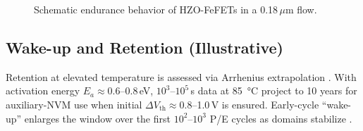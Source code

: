 \documentclass[journal]{IEEEtran}
\begin{document}
\begin{figure}[t]
\centering
{}
\caption{Schematic endurance behavior of HZO-FeFETs in a 0.18\,$\mu$m flow.}
\label{fig:endurance}
\end{figure}

\subsection*{Wake-up and Retention (Illustrative)}
Retention at elevated temperature is assessed via Arrhenius extrapolation \cite{Yamazaki2018}. With activation energy $E_a\!\approx\!0.6$--0.8\,eV, $10^3$--$10^5$\,s data at \SI{85}{\celsius} project to 10 years for auxiliary-NVM use when initial $\Delta V_\mathrm{th}\!\approx\!0.8$--1.0\,V is ensured. Early-cycle ``wake-up'' enlarges the window over the first $10^2$--$10^3$ P/E cycles as domains stabilize \cite{Boscke2011,Muller2012}.
\end{document}
